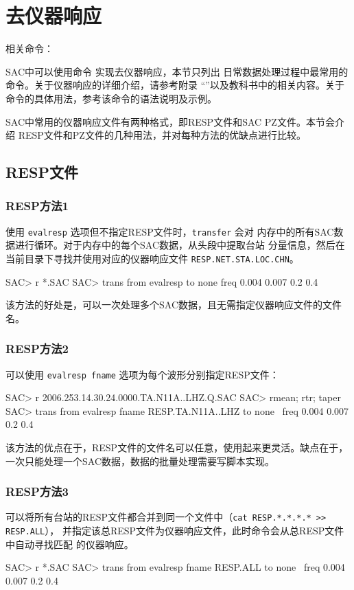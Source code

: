\section{去仪器响应}
\label{sec:instrument-response}
相关命令：

SAC中可以使用命令  实现去仪器响应，本节只列出
日常数据处理过程中最常用的命令。关于仪器响应的详细介绍，请参考附录
``''以及教科书中的相关内容。关于 
命令的具体用法，参考该命令的语法说明及示例。

SAC中常用的仪器响应文件有两种格式，即RESP文件和SAC PZ文件。本节会介绍
RESP文件和PZ文件的几种用法，并对每种方法的优缺点进行比较。

\subsection{RESP文件}

\subsubsection{RESP方法1}
使用 \texttt{evalresp} 选项但不指定RESP文件时，\texttt{transfer} 会对
内存中的所有SAC数据进行循环。对于内存中的每个SAC数据，从头段中提取台站
分量信息，然后在当前目录下寻找并使用对应的仪器响应文件
\texttt{RESP.NET.STA.LOC.CHN}。
\begin{SACCode}
SAC> r *.SAC
SAC> trans from evalresp to none freq 0.004 0.007 0.2 0.4
\end{SACCode}
该方法的好处是，可以一次处理多个SAC数据，且无需指定仪器响应文件的文件名。

\subsubsection{RESP方法2}
可以使用 \texttt{evalresp fname} 选项为每个波形分别指定RESP文件：
\begin{SACCode}
SAC> r 2006.253.14.30.24.0000.TA.N11A..LHZ.Q.SAC
SAC> rmean; rtr; taper
SAC> trans from evalresp fname RESP.TA.N11A..LHZ to none \
                                freq 0.004 0.007 0.2 0.4
\end{SACCode}
该方法的优点在于，RESP文件的文件名可以任意，使用起来更灵活。缺点在于，
一次只能处理一个SAC数据，数据的批量处理需要写脚本实现。

\subsubsection{RESP方法3}
可以将所有台站的RESP文件都合并到同一个文件中（\texttt{cat RESP.*.*.*.* >> RESP.ALL}），
并指定该总RESP文件为仪器响应文件，此时命令会从总RESP文件中自动寻找匹配
的仪器响应。
\begin{SACCode}
SAC> r *.SAC
SAC> trans from evalresp fname RESP.ALL to none \
                            freq 0.004 0.007 0.2 0.4
\end{SACCode}

